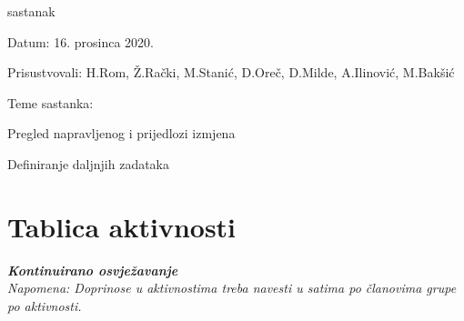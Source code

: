 \begin{packed_enum}
			\item  sastanak
			\item[] \begin{packed_item}
				\item Datum: 16. prosinca 2020.
				\item Prisustvovali: H.Rom, Ž.Rački, M.Stanić, D.Oreč, D.Milde, A.Ilinović, M.Bakšić
				\item Teme sastanka:
				\begin{packed_item}
					\item  Pregled napravljenog i prijedlozi izmjena
					\item  Definiranje daljnjih zadataka 
				\end{packed_item}
			\end{packed_item}
			
		\end{packed_enum}
		
		\eject
		\section*{Tablica aktivnosti}
		
			\textbf{\textit{Kontinuirano osvježavanje}}\\
			
			 \textit{Napomena: Doprinose u aktivnostima treba navesti u satima po članovima grupe po aktivnosti.}
					
						
			
